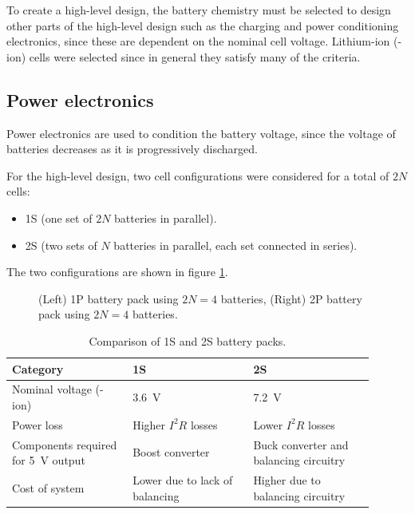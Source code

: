 \documentclass[draft]{report}
\newcommand{\liion}{\ce{Li}-ion}
\begin{document}
To create a high-level design, the battery chemistry must be selected to design other parts of the high-level design such as the charging and power conditioning electronics, since these are dependent on the nominal cell voltage. Lithium-ion (\liion) cells were selected since in general they satisfy many of the criteria.

\subsection{Power electronics}
\label{sec:hl-power-electronics}
Power electronics are used to condition the battery voltage, since the voltage of batteries decreases as it is progressively discharged.

For the high-level design, two cell configurations were considered for a total of $2N$ cells:
\begin{itemize}
  \item 1S (one set of $2N$ batteries in parallel).
  \item 2S (two sets of $N$ batteries in parallel, each set connected in series).
\end{itemize}

The two configurations are shown in figure \ref{fig:1s2s}.

\begin{figure}[H]
  \centering
  
  \caption{(Left) 1P battery pack using $2N=4$ batteries, (Right) 2P battery pack using $2N=4$ batteries.}
  \label{fig:1s2s}
\end{figure}

\begin{table}[H]
  \centering
  \begin{tabular}{|L{0.3\linewidth}|L{0.3\linewidth}|L{0.3\linewidth}|}
    \hline
    \textbf{Category}                            & \textbf{1S}                    & \textbf{2S}                            \\
    \hline
    Nominal voltage (\liion)                     & \SI{3.6}{\volt}                & \SI{7.2}{\volt}                        \\
    Power loss                                   & Higher $I^2R$ losses           & Lower $I^2R$ losses                    \\
    Components required for \SI{5}{\volt} output & Boost converter                & Buck converter and balancing circuitry \\
    Cost of system                               & Lower due to lack of balancing & Higher due to balancing circuitry      \\
    \hline
  \end{tabular}
  \caption{Comparison of 1S and 2S battery packs.}
  \label{tabl:battery-1s2s-comparison}
\end{table}
\end{document}
